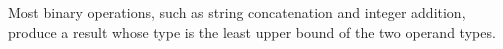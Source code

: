 Most binary operations, such as string concatenation and integer addition,
produce a result whose type is the least upper bound of the two operand types.





